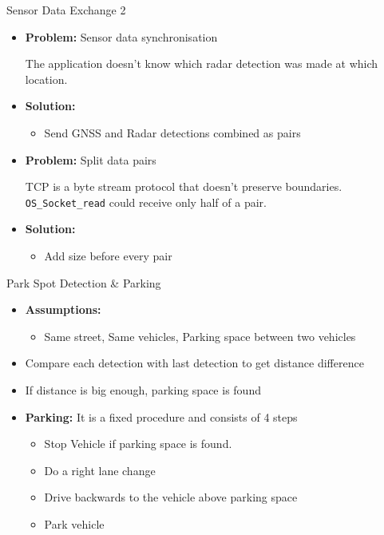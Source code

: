 \begin{frame}{Sensor Data Exchange 2}
\begin{itemize}

\item \textbf{Problem:} Sensor data synchronisation

The application doesn't know which radar detection was made at which location.

\item \textbf{Solution:} 
    \begin{itemize}
    \item Send GNSS and Radar detections combined as pairs
    \end{itemize}

\vspace{12pt} 
\item \textbf{Problem:} Split data pairs

TCP is a byte stream protocol that doesn't preserve boundaries. \texttt{OS\_Socket\_read} could receive only half of a pair.

\item \textbf{Solution:} 
    \begin{itemize}
    \item Add size before every pair
    \end{itemize}
 

\end{itemize}
\end{frame}

\begin{frame}{Park Spot Detection \& Parking}
\begin{itemize}


\item \textbf{Assumptions:} 
    \begin{itemize}
    \item Same street, Same vehicles, Parking space between two vehicles
    \end{itemize}
\vspace{12pt} 
\item Compare each detection with last detection to get distance difference
\item If distance is big enough, parking space is found
\vspace{12pt} 

\item \textbf{Parking:} It is a fixed procedure and consists of 4 steps
    \begin{itemize}
    \item Stop Vehicle if parking space is found.
    \item Do a right lane change
    \item Drive backwards to the vehicle above parking space
    \item Park vehicle

    

    \end{itemize}    

\end{itemize}
\end{frame}
